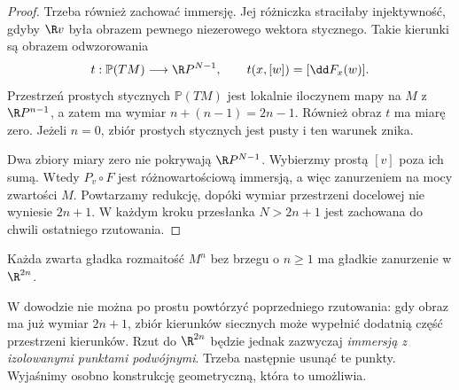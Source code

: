 \begin{proof}
Trzeba również zachować immersję. Jej
różniczka straciłaby injektywność,
gdyby $\R v$ była obrazem pewnego
niezerowego wektora stycznego.
Takie kierunki są obrazem odwzorowania
\[
 t:\mathbb P(TM)\longrightarrow\R P^{N-1},
       \qquad t(x,[w])=[\dd F_x(w)].
\]
Przestrzeń prostych stycznych
$\mathbb P(TM)$ jest lokalnie iloczynem
mapy na $M$ z $\R P^{n-1}$, a zatem
ma wymiar $n+(n-1)=2n-1$.
Również obraz $t$ ma miarę zero.
Jeżeli $n=0$, zbiór prostych stycznych
jest pusty i ten warunek znika.

Dwa zbiory miary zero nie pokrywają
$\R P^{N-1}$. Wybierzmy prostą $[v]$
poza ich sumą. Wtedy $P_v\circ F$ jest
różnowartościową immersją, a więc
zanurzeniem na mocy zwartości $M$.
Powtarzamy redukcję, dopóki wymiar
przestrzeni docelowej nie wyniesie
$2n+1$. W każdym kroku przesłanka
$N>2n+1$ jest zachowana do chwili
ostatniego rzutowania.
\end{proof}

\begin{twierdzenie}
\label{thm:whitney-mocne}
Każda zwarta gładka rozmaitość $M^n$ bez brzegu
o $n\geq1$ ma gładkie zanurzenie w $\R^{2n}$.
\end{twierdzenie}

W dowodzie nie można po prostu powtórzyć
poprzedniego rzutowania: gdy obraz ma już
wymiar $2n+1$, zbiór kierunków siecznych
może wypełnić dodatnią część przestrzeni
kierunków. Rzut do $\R^{2n}$ będzie jednak
zazwyczaj \emph{immersją z izolowanymi
punktami podwójnymi}. Trzeba następnie
usunąć te punkty. Wyjaśnimy osobno
konstrukcję geometryczną, która to umożliwia.

